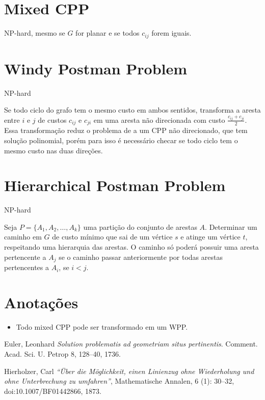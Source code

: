 \documentclass{article}
\begin{document}
	\section{Mixed CPP}

	NP-hard, mesmo se $G$ for planar e se todos $c_{ij}$ forem iguais.

	\section{Windy Postman Problem}

	NP-hard

	Se todo ciclo do grafo tem o mesmo custo em ambos sentidos, transforma a aresta entre $i$ e $j$ de custos $c_{ij}$ e $c_{ji}$ em uma aresta não direcionada com custo $\frac{c_{ij} + c_{ji}}{2}$. Essa transformação reduz o problema de a um CPP não direcionado, que tem solução polinomial, porém para isso é necessário checar se todo ciclo tem o mesmo custo nas duas direções.

	\section{Hierarchical Postman Problem}

	NP-hard 

	Seja $P = \{A_1, A_2, \dots, A_k\}$ uma partição do conjunto de arestas $A$. Determinar um caminho em $G$ de custo mínimo que sai de um vértice $s$ e atinge um vértice $t$, respeitando uma hierarquia das arestas. O caminho só poderá possuir uma aresta pertencente a $A_j$ se o caminho passar anteriormente por todas arestas pertencentes a $A_i$, se $i < j$.


	\section{Anotações}

	\begin{itemize}
		\item Todo mixed CPP pode ser transformado em um WPP.
	\end{itemize}

	\medskip

	\begin{thebibliography}{9}
	Euler, Leonhard
	\textit{Solution problematis ad geometriam situs pertinentis}. 
	Comment. Acad. Sci. U. Petrop 8, 128–40, 1736.

	Hierholzer, Carl
	\textit{``Über die Möglichkeit, einen Linienzug ohne Wiederholung und ohne Unterbrechung zu umfahren''}, 
	Mathematische Annalen, 6 (1): 30–32, doi:10.1007/BF01442866, 1873.
	\end{thebibliography}
 
\end{document}
